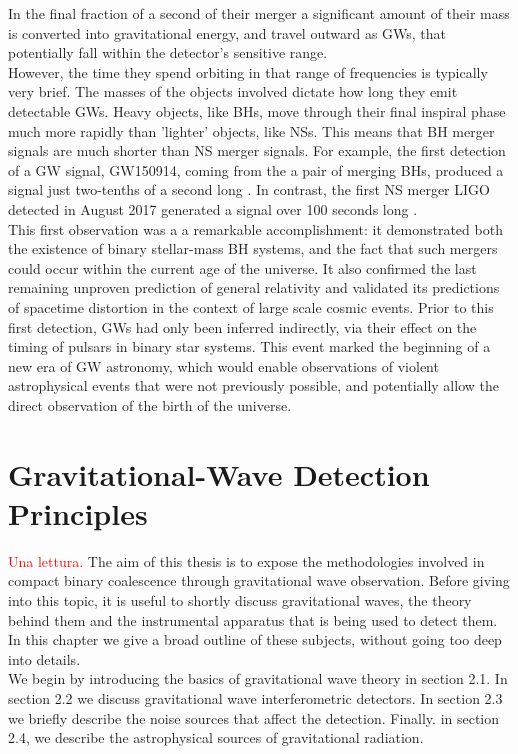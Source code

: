 \documentclass[binding=0.6cm, LaM]{sapthesis}
\newcommand{\fpg}[1]{\textcolor{red}{#1} }
\begin{document}
	In the final fraction of a second of their merger a significant amount of their mass is converted into gravitational energy, 
	and travel outward as GWs, that potentially fall within the detector’s sensitive range. \\
	However, the time they spend orbiting in that range of frequencies is typically very brief.
        The masses of the objects involved dictate how long they emit detectable GWs. 
        Heavy objects, like BHs, move through their final inspiral phase much more rapidly than 'lighter' objects, 
        like NSs. This means that BH  merger signals are much shorter than NS merger signals.
        For example, the first detection of a GW signal, GW150914, coming from the a pair of merging BHs, 
	produced a signal just two-tenths of a second long \cite{14}. 
        In contrast, the first NS merger LIGO detected in August 2017 generated a signal over 100 seconds long \cite{15}. \\
	This first observation was a a remarkable accomplishment: it demonstrated both the existence of binary stellar-mass BH systems, 
	and the fact that such mergers could occur within the current age of the universe.  
	It also confirmed the last remaining unproven prediction of general relativity and validated 
	its predictions of spacetime distortion in the context of large scale cosmic events. 
	Prior to this first detection, GWs had only been inferred indirectly,
        via their effect on the timing of pulsars in binary star systems.
	This event  marked the beginning of a new era of GW astronomy, 
	which would enable observations of violent astrophysical events that were not previously possible, 
	and potentially allow the direct observation of the birth of the universe.


\chapter{Gravitational-Wave Detection Principles}
\fpg{Una lettura.}%
	The aim of this thesis is to expose the methodologies involved 
	in compact binary coalescence through gravitational wave observation. 
	Before giving into this topic, it is useful to shortly discuss gravitational waves, 
	the theory behind them and the instrumental apparatus that is being used to detect them. 
	In this chapter we give a broad outline of these subjects, 
	without going too deep into details. \\
	We begin by introducing the basics of gravitational wave theory in section 2.1. 
	In section 2.2 we discuss gravitational wave interferometric detectors. 
	In section 2.3 we briefly describe the noise sources that affect the detection. 
	Finally. in section 2.4, we describe the astrophysical sources of gravitational radiation.
\end{document}
